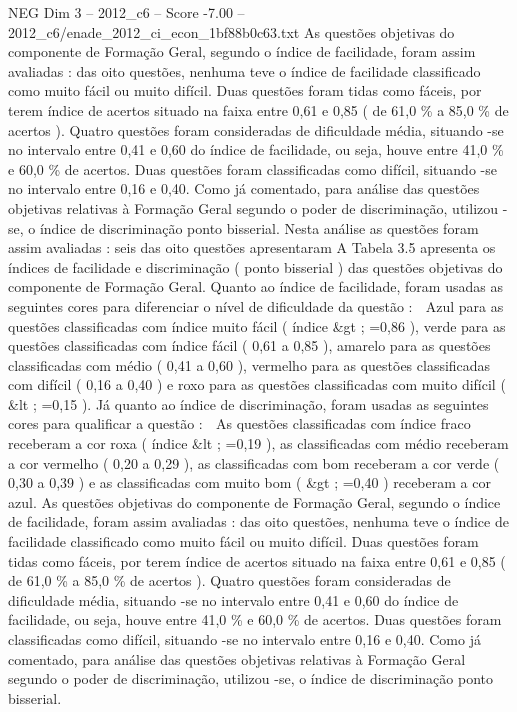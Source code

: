 \begin{textsample}{NEG Dim 3 – 2012\_c6 – Score -7.00 – 2012\_c6/enade\_2012\_ci\_econ\_1bf88b0c63.txt}
As questões objetivas do componente de Formação Geral, segundo o índice de facilidade, foram assim avaliadas : das oito questões, nenhuma teve o índice de facilidade classificado como muito fácil ou muito difícil.
Duas questões foram tidas como fáceis, por terem índice de acertos situado na faixa entre 0,61 e 0,85 ( de 61,0 \% a 85,0 \% de acertos ).
Quatro questões foram consideradas de dificuldade média, situando -se no intervalo entre 0,41 e 0,60 do índice de facilidade, ou seja, houve entre 41,0 \% e 60,0 \% de acertos.
Duas questões foram classificadas como difícil, situando -se no intervalo entre 0,16 e 0,40.
Como já comentado, para análise das questões objetivas relativas à Formação Geral segundo o poder de discriminação, utilizou -se, o índice de discriminação ponto bisserial.
Nesta análise as questões foram assim avaliadas : seis das oito questões apresentaram A Tabela 3.5 apresenta os índices de facilidade e discriminação ( ponto bisserial ) das questões objetivas do componente de Formação Geral.
Quanto ao índice de facilidade, foram usadas as seguintes cores para diferenciar o nível de dificuldade da questão :  Azul para as questões classificadas com índice muito fácil ( índice \&gt ; =0,86 ), verde para as questões classificadas com índice fácil ( 0,61 a 0,85 ), amarelo para as questões classificadas com médio ( 0,41 a 0,60 ), vermelho para as questões classificadas com difícil ( 0,16 a 0,40 ) e roxo para as questões classificadas com muito difícil ( \&lt ; =0,15 ).
Já quanto ao índice de discriminação, foram usadas as seguintes cores para qualificar a questão :  As questões classificadas com índice fraco receberam a cor roxa ( índice \&lt ; =0,19 ), as classificadas com médio receberam a cor vermelho ( 0,20 a 0,29 ), as classificadas com bom receberam a cor verde ( 0,30 a 0,39 ) e as classificadas com muito bom ( \&gt ; =0,40 ) receberam a cor azul.
As questões objetivas do componente de Formação Geral, segundo o índice de facilidade, foram assim avaliadas : das oito questões, nenhuma teve o índice de facilidade classificado como muito fácil ou muito difícil.
Duas questões foram tidas como fáceis, por terem índice de acertos situado na faixa entre 0,61 e 0,85 ( de 61,0 \% a 85,0 \% de acertos ).
Quatro questões foram consideradas de dificuldade média, situando -se no intervalo entre 0,41 e 0,60 do índice de facilidade, ou seja, houve entre 41,0 \% e 60,0 \% de acertos.
Duas questões foram classificadas como difícil, situando -se no intervalo entre 0,16 e 0,40.
Como já comentado, para análise das questões objetivas relativas à Formação Geral segundo o poder de discriminação, utilizou -se, o índice de discriminação ponto bisserial.

\end{textsample}

